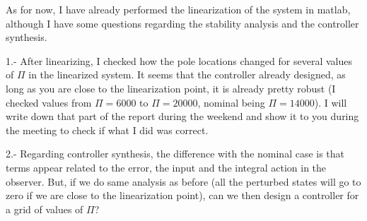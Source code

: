 \documentclass[main.tex]{subfiles}
\begin{document}
	

As for now, I have already performed the linearization of the system in matlab, although I have some questions regarding the stability analysis and the controller synthesis.

1.- After linearizing, I checked how the pole locations changed for several values of $\Pi$ in the linearized system. It seems that the controller already designed, as long as you are close to the linearization point, it is already pretty robust (I checked values from $\Pi = 6000$ to $\Pi = 20000$, nominal being $\Pi = 14000$). I will write down that part of the report during the weekend and show it to you during the meeting to check if what I did was correct.

2.- Regarding controller synthesis, the difference with the nominal case is that terms appear related to the error, the input and the integral action in the observer. But, if we do same analysis as before (all the perturbed states will go to zero if we are close to the linearization point), can we then design a controller for a grid of values of $\Pi$?
\end{document}
